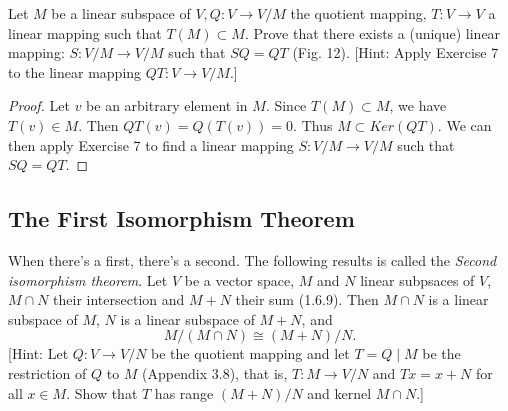\begin{tcolorbox}[title=Problem 8, breakable]
    Let $M$ be a linear subspace of $V, Q: V \longrightarrow V/M$ the quotient mapping,
    $T : V \longrightarrow V$ a linear mapping such that $T(M) \subset M$. Prove that there 
    exists a (unique) linear mapping: $S : V/M \longrightarrow V/M$ such that $SQ = QT$ (Fig. 12).
    [Hint: Apply Exercise 7 to the linear mapping $QT : V \longrightarrow V/M$.]
\end{tcolorbox}

\begin{proof}
    Let $v$ be an arbitrary element in $M$.
    Since $T(M) \subset M$, we have $T(v) \in M$.
    Then $QT(v) = Q(T(v)) = 0$.
    Thus $M \subset Ker(QT)$.
    We can then apply Exercise 7 to find a linear mapping $S : V / M \longrightarrow V / M$
        such that $SQ = QT$.
\end{proof}

\subsection{The First Isomorphism Theorem}

\begin{tcolorbox}[title=Problem 1, breakable]
    When there's a first, there's a second.
    The following results is called the \emph{Second isomorphism theorem}.
    Let $V$ be a vector space, $M$ and $N$ linear subpsaces of $V$, $M \cap N$
    their intersection and $M + N$ their sum (1.6.9).
    Then $M \cap N$ is a linear subspace of $M$, $N$ is a linear subspace of $M + N$,
    and 
    \[M / (M \cap N) \cong (M + N) / N.\]
    [Hint: Let $Q : V \longrightarrow V / N$ be the quotient mapping and let $T = Q \mid M$
    be the restriction of $Q$ to $M$ (Appendix 3.8), that is, $T : M \longrightarrow V / N$
    and $Tx = x + N$ for all $x \in M$. Show that $T$ has range $(M + N) / N$ and kernel $M \cap N$.]
\end{tcolorbox}

